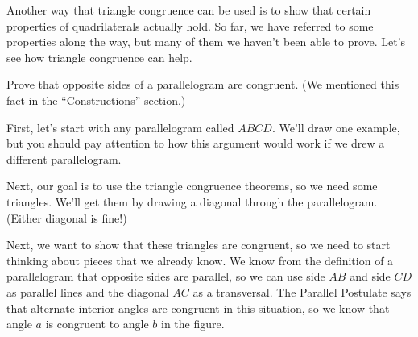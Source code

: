 \documentclass{ximera}
\begin{document}
Another way that triangle congruence can be used is to show that certain properties of quadrilaterals actually hold. So far, we have referred to some properties along the way, but many of them we haven't been able to prove. Let's see how triangle congruence can help.

\begin{example}
Prove that opposite sides of a parallelogram are congruent. (We mentioned this fact in the ``Constructions'' section.)

First, let's start with any parallelogram called $ABCD$. We'll draw one example, but you should pay attention to how this argument would work if we drew a different parallelogram.
\begin{image}\end{image}
Next, our goal is to use the triangle congruence theorems, so we need some triangles. We'll get them by drawing a diagonal through the parallelogram. (Either diagonal is fine!)
\begin{image}\end{image}
Next, we want to show that these triangles are congruent, so we need to start thinking about pieces that we already know. We know from the definition of a parallelogram that opposite sides are parallel, so we can use side $AB$ and side $CD$ as parallel lines and the diagonal $AC$ as a transversal. The Parallel Postulate says that alternate interior angles are congruent in this situation, so we know that angle $a$ is congruent to angle $b$ in the figure.
\begin{image}\end{image}

\end{example}
\end{document}
